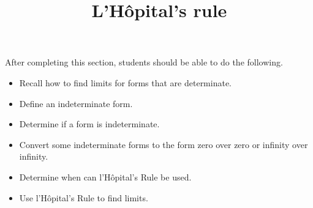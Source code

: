 \documentclass{ximera}
\title{L'H\^{o}pital's rule}
\begin{document}
\begin{abstract}
\end{abstract}

\maketitle

\begin{sectionOutcomes}

After completing this section, students should be able to do the following.

\begin{itemize}
	\item Recall how to find limits for forms that are determinate.
	\item Define an indeterminate form.
	\item Determine if a form is indeterminate.
	\item Convert some indeterminate forms to the form zero over zero
          or infinity over infinity.
	\item Determine when  can  l'H\^{o}pital's Rule be used.
	\item Use l'H\^{o}pital's Rule to find limits.
\end{itemize}

\end{sectionOutcomes}
\end{document}
